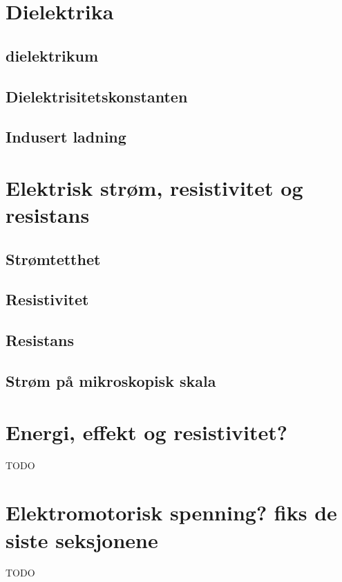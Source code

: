 \documentclass{article}
\begin{document}
  \section{Dielektrika}
    \subsection{dielektrikum}
      
    \subsection{Dielektrisitetskonstanten}
      
    \subsection{Indusert ladning}
      
  \section{Elektrisk strøm, resistivitet og resistans}
    \subsection{Strømtetthet}
      
    \subsection{Resistivitet}
      
    \subsection{Resistans}
      
    \subsection{Strøm på mikroskopisk skala}
      
  \section{Energi, effekt og resistivitet?}
    TODO
  \section{Elektromotorisk spenning? fiks de siste seksjonene}
    TODO
\end{document}
